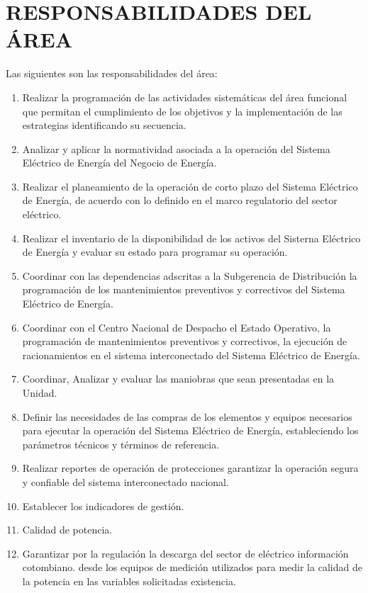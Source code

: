 \documentclass[a5paper]{book}%
\begin{document}
\section{RESPONSABILIDADES DEL ÁREA}

Las siguientes son las responsabilidades del área:\\

\begin{enumerate}
	\item Realizar la programación de las actividades sistemáticas del área funcional que permitan
	el cumplimiento de los objetivos y la implementación de las estrategias identificando su secuencia.
	\item Analizar y aplicar la normatividad asociada a la operación del Sistema Eléctrico de Energía
	del Negocio de Energía.
	\item Realizar el planeamiento de la operación de corto plazo del Sistema Eléctrico  de Energía, de acuerdo con lo definido en el marco regulatorio del sector eléctrico.
	\item Realizar el inventario de la disponibilidad de los activos del Sisterna Eléctrico  de Energía y evaluar su estado para programar su  operación.
	\item Coordinar con las dependencias adscritas a la Subgerencia de Distribución  la programación de los mantenimientos preventivos y correctivos del Sistema Eléctrico de Energía.
	\item Coordinar con el Centro Nacional de Despacho el Estado  Operativo, la programación de mantenimientos preventivos y correctivos, la ejecución de racionamientos en el sistema interconectado del Sistema Eléctrico de Energía.
	\item Coordinar, Analizar y evaluar las maniobras que sean presentadas en la Unidad.
	\item Definir las necesidades de las compras de los elementos y equipos necesarios para ejecutar la operación del Sistema Eléctrico de Energía, estableciendo los parámetros  técnicos y términos de referencia.
	\item Realizar  reportes de operación  de protecciones garantizar la operación  segura y confiable del sistema interconectado nacional.
	\item Establecer los indicadores de gestión.
	\item Calidad de potencia.
	\item Garantizar por la regulación la descarga del sector de eléctrico información cotombiano.  desde los equipos de medición  utilizados para medir la calidad de la potencia en las variables solicitadas existencia.

\end{enumerate}
\end{document}
